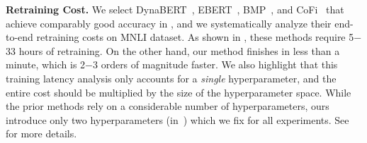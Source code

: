 \textbf{Retraining Cost.}
We select DynaBERT~\cite{hou2020dynabert}, EBERT~\cite{liu2021ebert}, BMP~\cite{lagunas2021block}, and CoFi~\cite{xia2022structured} that achieve comparably good accuracy in , and we systematically analyze their end-to-end retraining costs on MNLI dataset.
As shown in , these methods require 5$-$33 hours of retraining.
On the other hand, our method finishes in less than a minute, which is 2$-$3 orders of magnitude faster. 
We also highlight that this training latency analysis only accounts for a \textit{single} hyperparameter, and the entire cost should be multiplied by the size of the hyperparameter space.
While the prior methods rely on a considerable number of hyperparameters, ours introduce only two hyperparameters (in~) which we fix for all experiments.
See  for more details.

\begin{table}[!t]
\caption{
Ablation of our mask search, rearrangement, and tuning methods, described in .
We use BERT$_\textsc{BASE}$ as the baseline model, and we prune it with a 60\% FLOPs constraint.
}
\vspace{-2mm}
\label{tab:ablation}
    \centering
    \small{
    }
\end{table}

